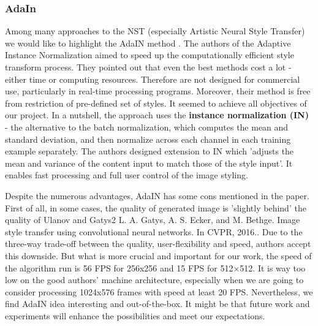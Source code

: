 \documentclass[../Main.tex]{subfiles}
\begin{document}
    \subsubsection{AdaIn}
    Among many approaches to the NST (especially Artistic Neural Style Transfer) we would like to highlight the AdaIN method \cite{huang2017adain}. The authors of the Adaptive Instance Normalization aimed to speed up the computationally efficient style transform process. They pointed out that even the best methods cost a lot - either time or computing resources. Therefore are not designed for commercial use, particularly in real-time processing programs. Moreover, their method is free from restriction of pre-defined set of styles. It seemed to achieve all objectives of our project.
    In a nutshell, the approach uses the \textbf{instance normalization (IN)} - the alternative to the batch normalization, which computes the mean and standard deviation, and then normalize across each channel in each training example separately. The authors designed extension to IN which 'adjusts the mean and variance of the
    content input to match those of the style input'. It enables fast processing and full user control of the image styling.
    
    Despite the numerous advantages, AdaIN has some cons mentioned in the paper. First of all, in some cases, the quality of generated image is 'slightly behind' the quality of Ulanov  and Gatys2 {L. A. Gatys, A. S. Ecker, and M. Bethge. Image style transfer
    using convolutional neural networks. In CVPR, 2016.}. Due to the three-way trade-off between the quality, user-flexibility and speed, authors accept this downside. But what is more crucial and important for our work, the speed of the algorithm run is 56 FPS for 256x256 and 15 FPS for 512×512. It is way too low on the good authors' machine architecture, especially when we are going to consider processing 1024x576 frames with speed at least 20 FPS.
    Nevertheless, we find AdaIN idea interesting and out-of-the-box. It might be that future work and experiments will enhance the possibilities and meet our expectations.
\end{document}
